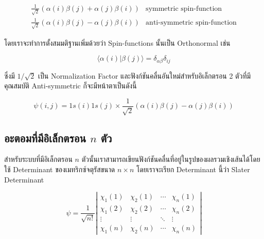 \begin{equation}
    \begin{array}{ll}
    \frac{1}{\sqrt{2}}(\alpha(i) \beta(j)+\alpha(j) \beta(i)) & \text{symmetric spin-function} \\
    \frac{1}{\sqrt{2}}(\alpha(i) \beta(j)-\alpha(j) \beta(i)) & \text{anti-symmetric spin-function}
    \end{array}
\end{equation}

\noindent โดยเราจะทำการตั้งสมมติฐานเพิ่มด้วยว่า Spin-functions นั้นเป็น Orthonormal เช่น

\begin{equation}
    \label{eq:Spin_function_orthogonality}
    \langle\alpha(i) | \beta(j)\rangle=\delta_{\alpha \beta} \delta_{i j}
\end{equation}

\noindent ซึ่งมี $1 / \sqrt{2}$ เป็น Normalization Factor และฟังก์ชันคลื่นอันใหม่สำหรับอิเล็กตรอน 2 ตัวที่มีคุณสมบัติ Anti-symmetric 
ก็จะมีหน้าตาเป็นดังนี้

\begin{equation}
    \psi(i, j) 
    = 
    1 s(i) 1 s(j) \times \frac{1}{\sqrt{2}}(\alpha(i) \beta(j)-\alpha(j) \beta(i))
\end{equation}

\subsection{อะตอมที่มีอิเล็กตรอน $n$ ตัว}

สำหรับระบบที่มีอิเล็กตรอน $n$ ตัวนั้นเราสามารถเขียนฟังก์ชันคลื่นที่อยู่ในรูปของผลรวมเชิงเส้นได้โดยใช้ Determinant ของเมทริกซ์จตุรัสขนาด 
$n \times n$ โดยเราจะเรียก Determinant นี้ว่า Slater Determinant

\begin{equation}
    \label{eq:Slater_determinant}
    \psi = 
    \frac{1}{\sqrt{n !}}
    \left|
        \begin{array}{cccc}
            \chi_1(1) & \chi_2(1) & \cdots & \chi_n(1) \\
            \chi_1(2) & \chi_2(2) & \cdots & \chi_n(2) \\
            \vdots & \vdots & \ddots & \vdots \\
            \chi_1(n) & \chi_2(n) & \cdots & \chi_n(n)
        \end{array}
    \right|
\end{equation}

